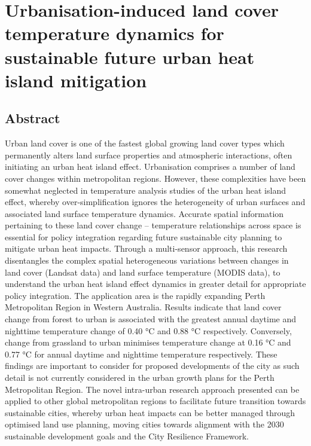 \documentclass[]{book}
\begin{document}
\chapter{Urbanisation-induced land cover temperature dynamics for
sustainable future urban heat island
mitigation}\label{urbanisation-induced-land-cover-temperature-dynamics-for-sustainable-future-urban-heat-island-mitigation}

\section{Abstract}\label{abstract-3}

Urban land cover is one of the fastest global growing land cover types
which permanently alters land surface properties and atmospheric
interactions, often initiating an urban heat island effect. Urbanisation
comprises a number of land cover changes within metropolitan regions.
However, these complexities have been somewhat neglected in temperature
analysis studies of the urban heat island effect, whereby
over-simplification ignores the heterogeneity of urban surfaces and
associated land surface temperature dynamics. Accurate spatial
information pertaining to these land cover change -- temperature
relationships across space is essential for policy integration regarding
future sustainable city planning to mitigate urban heat impacts. Through
a multi-sensor approach, this research disentangles the complex spatial
heterogeneous variations between changes in land cover (Landsat data)
and land surface temperature (MODIS data), to understand the urban heat
island effect dynamics in greater detail for appropriate policy
integration. The application area is the rapidly expanding Perth
Metropolitan Region in Western Australia. Results indicate that land
cover change from forest to urban is associated with the greatest annual
daytime and nighttime temperature change of 0.40 °C and 0.88 °C
respectively. Conversely, change from grassland to urban minimises
temperature change at 0.16 °C and 0.77 °C for annual daytime and
nighttime temperature respectively. These findings are important to
consider for proposed developments of the city as such detail is not
currently considered in the urban growth plans for the Perth
Metropolitan Region. The novel intra-urban research approach presented
can be applied to other global metropolitan regions to facilitate future
transition towards sustainable cities, whereby urban heat impacts can be
better managed through optimised land use planning, moving cities
towards alignment with the 2030 sustainable development goals and the
City Resilience Framework.


\end{document}
